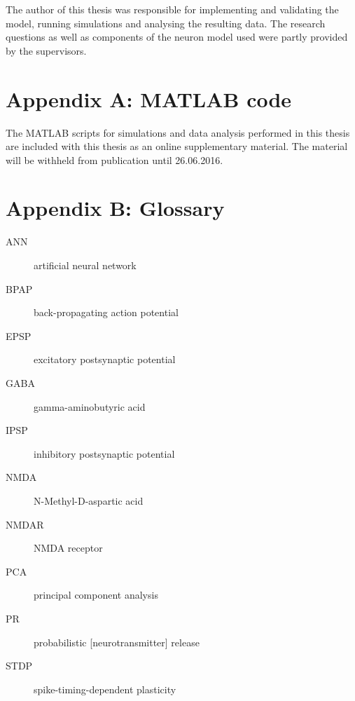 \documentclass[a4paper,12pt]{report}
\theoremstyle{definition}
\begin{document}
The author of this thesis was responsible for implementing and validating the model, running simulations and analysing the resulting data. The research questions as well as components of the neuron model used were partly provided by the supervisors.




\newpage






\chapter*{Appendix A: MATLAB code}
\label{appendix:code}

The MATLAB scripts for simulations and data analysis performed in this thesis are included with this thesis as an online supplementary material. The material will be withheld from publication until 26.06.2016.







\chapter*{Appendix B: Glossary}
\label{appendix:glossary}

\begin{description}
  \item[ANN] artificial neural network
  \item[BPAP] back-propagating action potential
  \item[EPSP] excitatory postsynaptic potential
  \item[GABA] gamma-aminobutyric acid
  \item[IPSP] inhibitory postsynaptic potential
  \item[NMDA] N-Methyl-D-aspartic acid
  \item[NMDAR] NMDA receptor
  \item[PCA] principal component analysis
  \item[PR] probabilistic [neurotransmitter] release
  \item[STDP] spike-timing-dependent plasticity
\end{description}
\end{document}
